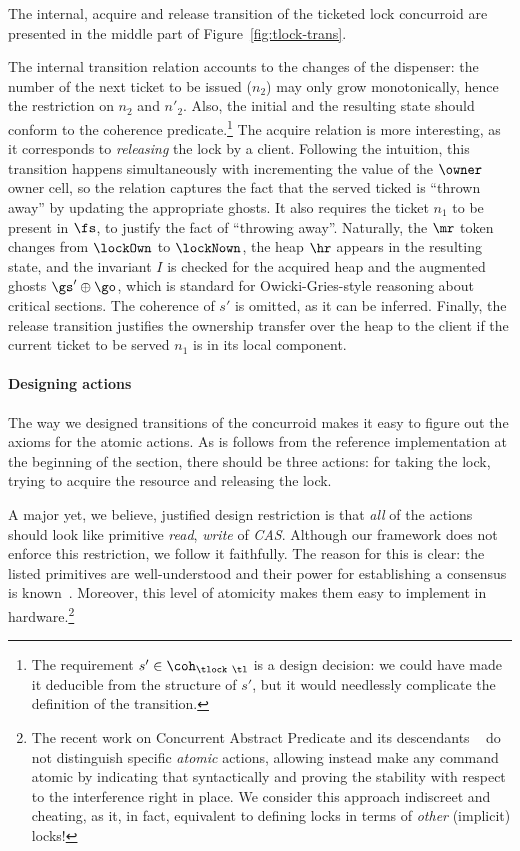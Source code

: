 The internal, acquire and release transition of the ticketed lock
concurroid are presented in the middle part of
Figure~\ref{fig:tlock-trans}.

The internal transition relation accounts to the changes of the
dispenser: the number of the next ticket to be issued ($n_2$) may only
grow monotonically, hence the restriction on $n_2$ and $n'_2$. Also,
the initial and the resulting state should conform to the coherence
predicate.\footnote{The requirement $s' \in \coh_{\tlock~\tl}$ is a
  design decision: we could have made it deducible from the structure
  of $s'$, but it would needlessly complicate the definition of the
  transition. }
%
The acquire relation is more interesting, as it corresponds to
\emph{releasing} the lock by a client. Following the intuition, this
transition happens simultaneously with incrementing the value of the
$\owner$ owner cell, so the relation captures the fact that the served
ticked is ``thrown away'' by updating the appropriate ghosts. It also
requires the ticket $n_1$ to be present in $\fs$, to justify the fact
of ``throwing away''. Naturally, the $\mr$ token changes from
$\lockOwn$ to $\lockNown$, the heap $\hr$ appears in the resulting
state, and the invariant $I$ is checked for the acquired heap and the
augmented ghosts $\gs' \oplus \go$, which is standard for
Owicki-Gries-style reasoning about critical sections. The coherence of
$s'$ is omitted, as it can be inferred.
%
Finally, the release transition justifies the ownership transfer over
the heap to the client if the current ticket to be served $n_1$ is in
its local component.

\paragraph{Designing actions}
\label{sec:designing-actions}

The way we designed transitions of the concurroid makes it easy to
figure out the axioms for the atomic actions.  As is follows from the
reference implementation at the beginning of the section, there should
be three actions: for taking the lock, trying to acquire the resource
and releasing the lock. 

A major yet, we believe, justified design restriction is that
\emph{all} of the actions should look like primitive \emph{read},
\emph{write} of \emph{CAS}. Although our framework does not enforce
this restriction, we follow it faithfully. The reason for this is
clear: the listed primitives are well-understood and their power for
establishing a consensus is known~\cite[Chapter
5]{Herlihy-Shavit:08}. Moreover, this level of atomicity makes them
easy to implement in hardware.\footnote{ The recent work on Concurrent
  Abstract Predicate and its descendants
  ~\cite{DinsdaleYoung-al:ECOOP10,Svendsen-al:ESOP13} do not
  distinguish specific \emph{atomic} actions, allowing instead make
  any command atomic by indicating that syntactically and proving the
  stability with respect to the interference right in place. We
  consider this approach indiscreet and cheating, as it, in fact,
  equivalent to defining locks in terms of \emph{other} (implicit)
  locks!  }

